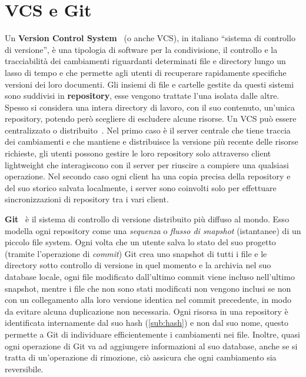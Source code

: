 \section{VCS e Git}
\label{sub:vcs}
Un \textbf{Version Control System}~\cite{vcs1} (o anche VCS), in italiano “sistema di controllo di versione”,
è una tipologia di software per la condivisione,
il controllo e la tracciabilità dei cambiamenti riguardanti determinati file e directory
lungo un lasso di tempo e che permette agli utenti di recuperare rapidamente specifiche
versioni dei loro documenti. Gli insiemi di file e cartelle gestite da questi sistemi
sono suddivisi in \textbf{repository}, esse vengono trattate l'una isolata dalle altre.
Spesso si considera una intera directory di lavoro, con il suo contenuto,
un'unica repository, potendo però scegliere di escludere alcune risorse.
Un VCS può essere centralizzato o distribuito~\cite{vcs2}.
Nel primo caso è il server centrale che tiene traccia dei cambiamenti e che mantiene e
distribuisce la versione più recente delle risorse richieste, gli utenti possono gestire
le loro repository solo attraverso client lightweight che interagiscono con il server
per riuscire a compiere una qualsiasi operazione.
Nel secondo caso ogni client ha una copia precisa della repository e del suo storico
salvata localmente, i server sono coinvolti solo per effettuare sincronizzazioni
di repository tra i vari client. 

\label{sub:git}
\textbf{Git}~\cite{git-21} è il sistema di controllo di versione distribuito più diffuso al mondo.
Esso modella ogni repository come una \emph{sequenza} o \emph{flusso di snapshot} (istantanee)
di un piccolo file system. Ogni volta che un utente salva lo stato del suo progetto
(tramite l'operazione di \emph{commit}) Git crea uno snapshot di tutti i file e le directory
sotto controllo di versione in quel momento e la archivia nel suo database locale, ogni
file modificato dall'ultimo commit viene incluso nell'ultimo snapshot, mentre i file che
non sono stati modificati non vengono inclusi se non con un collegamento alla loro versione identica
nel commit precedente, in modo da evitare alcuna duplicazione non necessaria.
Ogni risorsa in una repository è identificata internamente dal suo hash (\autoref{sub:hash}) e non dal suo nome,
questo permette a Git di individuare efficientemente i cambiamenti nei file.
Inoltre, quasi ogni operazione di Git va ad aggiungere informazioni al suo database, anche se si tratta
di un'operazione di rimozione, ciò assicura che ogni cambiamento sia reversibile.


